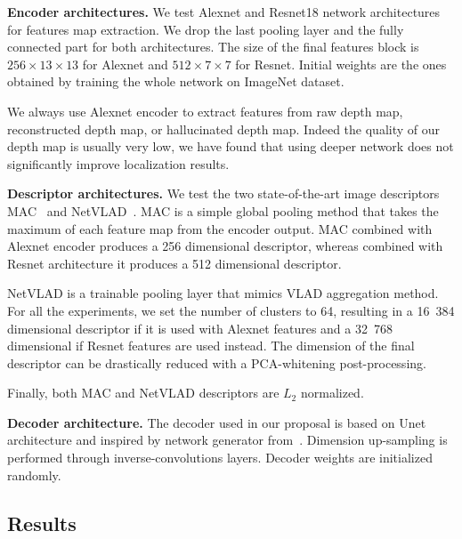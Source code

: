 \vspace{4pt}\noindent\textbf{Encoder architectures.} We test Alexnet and Resnet18 network architectures for features map extraction. We drop the last pooling layer and the fully connected part for both architectures. The size of the final features block is $256\times13\times13$ for Alexnet and $512\times7\times7$ for Resnet. Initial weights are the ones obtained by training the whole network on ImageNet dataset.

We always use Alexnet encoder to extract features from raw depth map, reconstructed depth map, or hallucinated depth map. Indeed the quality of our depth map is usually very low, we have found that using deeper network does not significantly improve localization results.

\vspace{4pt}\noindent\textbf{Descriptor architectures.} We test the two state-of-the-art image descriptors MAC~\cite{Radenovic2017} and NetVLAD~\cite{Arandjelovic2017}. MAC is a simple global pooling method that takes the maximum of each feature map from the encoder output. MAC combined with Alexnet encoder produces a 256 dimensional descriptor, whereas combined with Resnet architecture it produces a 512 dimensional descriptor.

NetVLAD is a trainable pooling layer that mimics VLAD aggregation method. For all the experiments, we set the number of clusters to 64, resulting in a 16~384 dimensional descriptor if it is used with Alexnet features and a 32~768 dimensional if Resnet features are used instead. The dimension of the final descriptor can be drastically reduced with a PCA-whitening post-processing.

Finally, both MAC and NetVLAD descriptors are $L_{2}$ normalized.

\vspace{4pt}\noindent\textbf{Decoder architecture.} The decoder used in our proposal is based on Unet architecture and inspired by network generator from~\cite{Isola2018}. Dimension up-sampling is performed through inverse-convolutions layers. Decoder weights are initialized randomly.

\subsection{Results}
\label{subsec:results}

